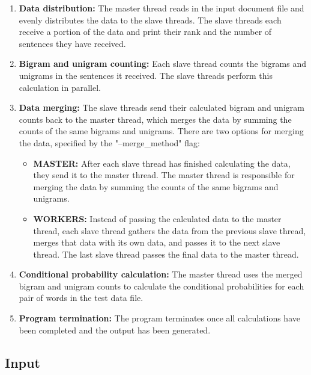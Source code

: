 \documentclass[12pt, A4, titlepage]{article}
\begin{document}
\begin{enumerate}[label=\textbf{\arabic*.}]
    \item \textbf{Data distribution:} The master thread reads in the input document file and evenly distributes the data to the slave threads. The slave threads each receive a portion of the data and print their rank and the number of sentences they have received.

    \item \textbf{Bigram and unigram counting:} Each slave thread counts the bigrams and unigrams in the sentences it received. The slave threads perform this calculation in parallel. 

    \item \textbf{Data merging:} The slave threads send their calculated bigram and unigram counts back to the master thread, which merges the data by summing the counts of the same bigrams and unigrams. There are two options for merging the data, specified by the "--merge\_method" flag:

    \begin{itemize}
        \item \textbf{MASTER:} After each slave thread has finished calculating the data, they send it to the master thread. The master thread is responsible for merging the data by summing the counts of the same bigrams and unigrams. 
        \item \textbf{WORKERS:} Instead of passing the calculated data to the master thread, each slave thread gathers the data from the previous slave thread, merges that data with its own data, and passes it to the next slave thread. The last slave thread passes the final data to the master thread. 
    \end{itemize}

    \item \textbf{Conditional probability calculation:} The master thread uses the merged bigram and unigram counts to calculate the conditional probabilities for each pair of words in the test data file. 

    \item \textbf{Program termination:} The program terminates once all calculations have been completed and the output has been generated.
\end{enumerate}


\subsection{Input}
\end{document}
